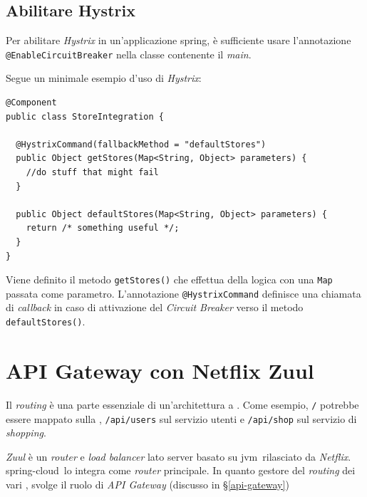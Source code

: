 \subsection{Abilitare Hystrix} Per abilitare \textit{Hystrix} in un'applicazione \gls{spring}\gloss,
è sufficiente usare l'annotazione \texttt{@EnableCircuitBreaker} nella classe contenente il \textit{main}.

Segue un minimale esempio d'uso di \textit{Hystrix}:

\begin{tcolorbox}
	\begin{lstlisting}
@Component
public class StoreIntegration {

  @HystrixCommand(fallbackMethod = "defaultStores")
  public Object getStores(Map<String, Object> parameters) {
    //do stuff that might fail
  }

  public Object defaultStores(Map<String, Object> parameters) {
    return /* something useful */;
  }
}
	\end{lstlisting}
\end{tcolorbox}

Viene definito il metodo \texttt{getStores()} che effettua della logica con una \texttt{Map} passata come parametro.
L'annotazione \texttt{@HystrixCommand} definisce una chiamata di \textit{callback} in caso di attivazione del \textit{Circuit Breaker} verso il metodo \texttt{defaultStores()}.


\section{API Gateway con Netflix Zuul}

Il \textit{routing} è una parte essenziale di un'architettura a . Come esempio, \texttt{/} potrebbe essere mappato sulla \gloss, \texttt{/api/users} sul servizio utenti e \texttt{/api/shop} sul servizio di \textit{shopping}.

\textit{Zuul} è un \textit{router} e \textit{load balancer} lato server basato su \gls{jvm}\gloss\ rilasciato da \textit{Netflix}. \gls{spring-cloud}\gloss\ lo integra come \textit{router} principale. In quanto gestore del \textit{routing} dei vari \gloss, svolge il ruolo di \textit{API Gateway} (discusso in \S\ref{api-gateway})

